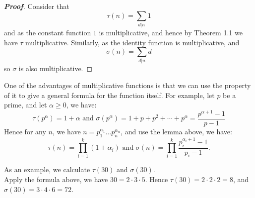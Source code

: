 \begin{proof}[\bf Proof] Consider that \begin{equation*} \tau(n)=\sum_{d|n}1 \end{equation*} and as the constant function $1$ is multiplicative, and hence by Theorem 1.1 we have $\tau$ multiplicative. Similarly, as the identity function is multiplicative, and \begin{equation*} \sigma(n)=\sum_{d|n}d \end{equation*} so $\sigma$ is also multiplicative.
\end{proof}
One of the advantages of multiplicative functions is that we can use the property of it to give a general formula for the function itself. For example, let $p$ be a prime, and let $\alpha \ge 0$, we have:
\begin{equation*}
\tau(p^\alpha) = 1 + \alpha \text{ and } \sigma(p^\alpha)=1+p+p^2+\cdots +p^\alpha = \frac{p^{\alpha+1}-1}{p-1}
\end{equation*}
Hence for any $n$, we have $n=p_1^{\alpha_1} \ldots p_n^{\alpha_n}$, and use the lemma above, we have:
\begin{equation*}
\tau(n)=\prod_{i=1}^{k}(1+\alpha_i) \text{ and } \sigma(n) = \prod_{i=1}^{k} \frac{p_i^{\alpha_i+1} -1}{p_i-1}.
\end{equation*}
\begin{example} As an example, we calculate $\tau(30)$ and $\sigma(30)$.\\
Apply the formula above, we have $30=2 \cdot 3 \cdot 5$. Hence $\tau(30)= 2 \cdot 2 \cdot 2 =8$, and $\sigma(30) = 3 \cdot 4 \cdot 6 = 72$.
\end{example}

